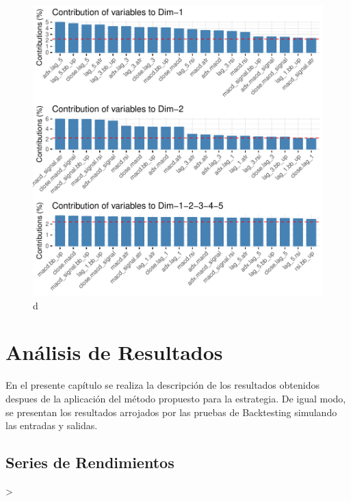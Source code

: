 \documentclass[a4paper,12pt]{Latex/Classes/PhDthesisPSnPDF}
\begin{document}
\begin{figure}[H]
\centering
\includegraphics{main-010}
\caption{d}
\end{figure}

\chapter{Análisis de Resultados}

En el presente capítulo se realiza la descripción de los resultados obtenidos despues de la aplicación del método propuesto para la estrategia. De igual modo, se presentan los resultados arrojados por las pruebas de Backtesting simulando las entradas y salidas.

\section{Series de Rendimientos}



\begin{Schunk}
\begin{Sinput}
> 
\end{Sinput}
\end{Schunk}
\end{document}

